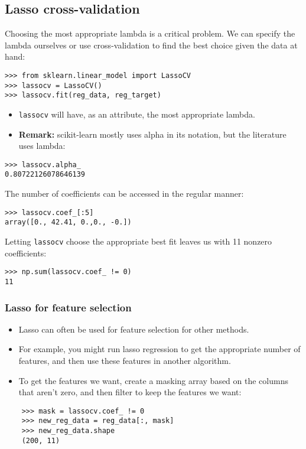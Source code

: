 \documentclass[SKL-MASTER.tex]{subfiles}
\begin{document}
\subsection{Lasso cross-validation}
Choosing the most appropriate lambda is a critical problem. We can specify the lambda
ourselves or use cross-validation to find the best choice given the data at hand:
\begin{framed}
\begin{verbatim}
>>> from sklearn.linear_model import LassoCV
>>> lassocv = LassoCV()
>>> lassocv.fit(reg_data, reg_target)
\end{verbatim}
\end{framed}
\begin{itemize}
\item \texttt{lassocv} will have, as an attribute, the most appropriate lambda. 
\item \textbf{Remark:} scikit-learn mostly uses
alpha in its notation, but the literature uses lambda:
\end{itemize}
\begin{framed}
\begin{verbatim}
>>> lassocv.alpha_
0.80722126078646139
\end{verbatim}
\end{framed}
The number of coefficients can be accessed in the regular manner:
\begin{framed}
	\begin{verbatim}
>>> lassocv.coef_[:5]
array([0., 42.41, 0.,0., -0.])
\end{verbatim}
\end{framed}
Letting \texttt{lassocv} choose the appropriate best fit leaves us with 11 nonzero coefficients:

\begin{framed}
\begin{verbatim}
>>> np.sum(lassocv.coef_ != 0)
11
\end{verbatim}
\end{framed}


\subsubsection{Lasso for feature selection}
\begin{itemize}
\item Lasso can often be used for feature selection for other methods. 
\item For example, you might run
lasso regression to get the appropriate number of features, and then use these features in
another algorithm.
\item To get the features we want, create a masking array based on the columns that aren't zero,
and then filter to keep the features we want:
\end{itemize}

\begin{framed}
	\begin{verbatim}
	>>> mask = lassocv.coef_ != 0
	>>> new_reg_data = reg_data[:, mask]
	>>> new_reg_data.shape
	(200, 11)
	\end{verbatim}
\end{framed}
\end{document}
